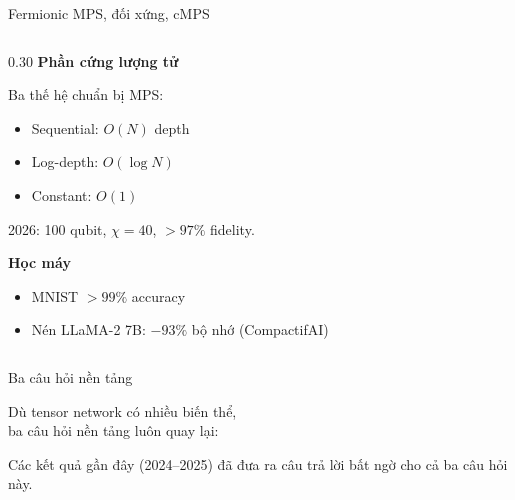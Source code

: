 \documentclass[aspectratio=169, 11pt]{beamer}
\newcommand{\good}[1]{\textcolor{qgreen}{#1}}
\begin{document}
\begin{frame}[shrink=3]{Fermionic MPS, đối xứng, cMPS}
\begin{columns}[T]
\begin{column}{0.30\textwidth}
\textcolor{qamber}{\textbf{Phần cứng lượng tử}}\\[3pt]
{\small Ba thế hệ chuẩn bị MPS:
\begin{itemize}
  \item Sequential: $O(N)$ depth
  \item Log-depth: $O(\log N)$
  \item \good{Constant}: $O(1)$
\end{itemize}
2026: 100 qubit, $\chi\!=\!40$, $>97\%$ fidelity.}

\vspace{6pt}
\textcolor{qamber}{\textbf{Học máy}}\\[3pt]
{\small
\begin{itemize}
  \item MNIST $>99\%$ accuracy
  \item Nén LLaMA-2 7B: $-93\%$ bộ nhớ (CompactifAI)
\end{itemize}}

\end{column}
\end{columns}

\end{frame}

\begin{frame}{Ba câu hỏi nền tảng}

\vspace{12pt}
\begin{center}
{\large Dù tensor network có nhiều biến thể,\\[4pt]
ba câu hỏi nền tảng luôn quay lại:}

\vspace{16pt}
\end{center}

\vspace{12pt}
{\small\textcolor{dimtext}{Các kết quả gần đây (2024--2025) đã đưa ra câu trả lời bất ngờ cho cả ba câu hỏi này.}}

\end{frame}
\end{document}
